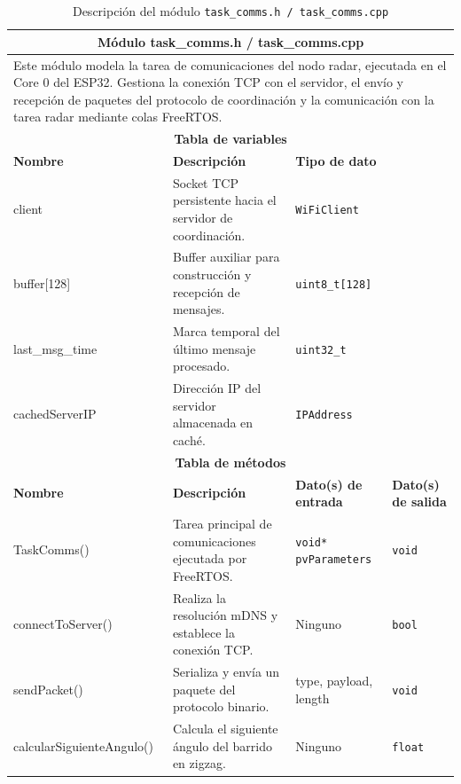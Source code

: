 \begin{table}[h!]
\centering
\small
\renewcommand{\arraystretch}{1.25}
\begin{tabular}{|p{2.8cm}|p{5.5cm}|p{2.8cm}|p{1.7cm}|}
\hline
\multicolumn{4}{|c|}{\textbf{Módulo task\_comms.h / task\_comms.cpp}} \\
\hline
\multicolumn{4}{|p{12.8cm}|}{Este módulo modela la tarea de comunicaciones del
nodo radar, ejecutada en el Core 0 del ESP32. Gestiona la conexión TCP con el
servidor, el envío y recepción de paquetes del protocolo de coordinación y la
comunicación con la tarea radar mediante colas FreeRTOS.} \\
\hline
\multicolumn{4}{|c|}{\textbf{Tabla de variables}} \\
\hline
\textbf{Nombre} & \textbf{Descripción} & \multicolumn{2}{l|}{\textbf{Tipo de dato}} \\
\hline
client & Socket TCP persistente hacia el servidor de coordinación. & \multicolumn{2}{l|}{\texttt{WiFiClient}} \\
\hline
buffer[128] & Buffer auxiliar para construcción y recepción de mensajes. & \multicolumn{2}{l|}{\texttt{uint8\_t[128]}} \\
\hline
last\_msg\_time & Marca temporal del último mensaje procesado. & \multicolumn{2}{l|}{\texttt{uint32\_t}} \\
\hline
cachedServerIP & Dirección IP del servidor almacenada en caché. & \multicolumn{2}{l|}{\texttt{IPAddress}} \\
\hline
\multicolumn{4}{|c|}{\textbf{Tabla de métodos}} \\
\hline
\textbf{Nombre} & \textbf{Descripción} & \textbf{Dato(s) de entrada} & \textbf{Dato(s) de salida} \\
\hline
TaskComms() & Tarea principal de comunicaciones ejecutada por FreeRTOS. & \texttt{void* pvParameters} & \texttt{void} \\
\hline
connectToServer() & Realiza la resolución mDNS y establece la conexión TCP. & Ninguno & \texttt{bool} \\
\hline
sendPacket() & Serializa y envía un paquete del protocolo binario. & type, payload, length & \texttt{void} \\
\hline
calcularSiguienteAngulo() & Calcula el siguiente ángulo del barrido en zigzag. & Ninguno & \texttt{float} \\
\hline
\end{tabular}
\caption{Descripción del módulo \texttt{task\_comms.h / task\_comms.cpp}}
\label{tab:module_comms}
\end{table}

